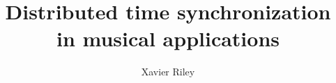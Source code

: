 \documentclass[11pt]{article} %
\title{Distributed time synchronization in musical applications}
\author{Xavier Riley}
\theoremstyle{plain}
\theoremstyle{definition}
\begin{document}
\maketitle

\declaration

%



\end{document}
